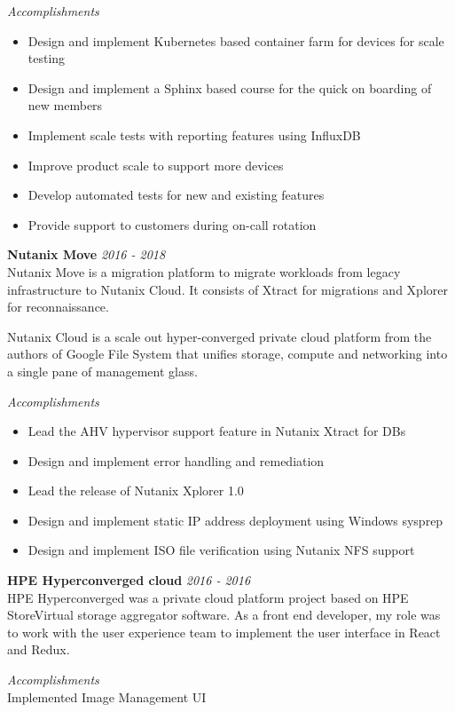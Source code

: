 \documentclass[line,margin]{res}
\begin{document}
\begin{resume}
{\it{Accomplishments}}\\
\begin{itemize}
\item Design and implement Kubernetes based container farm for devices for scale testing
\item Design and implement a Sphinx based course for the quick on boarding of new members 
\item Implement scale tests with reporting features using InfluxDB
\item Improve product scale to support more devices
\item Develop automated tests for new and existing features
\item Provide support to customers during on-call rotation
\end{itemize}
{\bf Nutanix Move} \hfill {\it{2016 - 2018}}\\

Nutanix Move is a migration platform to migrate workloads from legacy infrastructure to Nutanix Cloud. It consists of Xtract for migrations and Xplorer for reconnaissance.

Nutanix Cloud is a scale out hyper-converged private cloud platform from the authors of Google File System that unifies storage, compute and networking into a single pane of management glass. 

{\it{Accomplishments}}\\
\begin{itemize}
\item Lead the AHV hypervisor support feature in Nutanix Xtract for DBs
\item Design and implement error handling and remediation
\item Lead the release of Nutanix Xplorer 1.0
\item Design and implement static IP address deployment using Windows sysprep
\item Design and implement ISO file verification using Nutanix NFS support
\end{itemize}

{\bf HPE Hyperconverged cloud} \hfill {\it{2016 - 2016}}\\

HPE Hyperconverged was a private cloud platform project based on HPE StoreVirtual storage aggregator software. As a front end developer, my role was to work with the user experience team to implement the user interface in React and Redux.

{\it{Accomplishments}}\\
Implemented Image Management UI\\


\end{resume}
\end{document}
